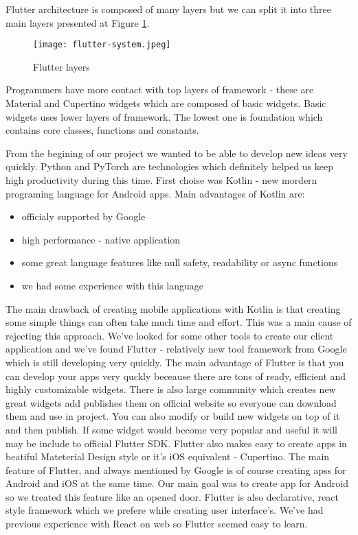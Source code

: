 \documentclass[../Main.tex]{subfiles}
\begin{document}
        
        Flutter architecture is composed of many layers but we can split it into 
        three main layers presented at Figure \ref{fig:flutter-layers}.
        \begin{figure}[h]
            \centering
            \texttt{[image: flutter-system.jpeg]}
            \caption{Flutter layers}
            \label{fig:flutter-layers}
        \end{figure}
        Programmers have more contact with top layers of framework - 
        these are Material and Cupertino widgets which are composed of basic widgets.
        Basic widgets uses lower layers of framework. 
        The lowest one is foundation which contains core classes, functions and constants.
    
    
        From the begining of our project we wanted to be able to develop new ideas
        very quickly.
        Python and PyTorch are technologies which definitely helped us keep high
        productivity during this time. First choise was Kotlin - new mordern programing 
        language for Android apps. Main advantages of Kotlin are:
            \begin{itemize}
                \item officialy supported by Google
                \item high performance - native application
                \item some great language features like null safety, readability or async functions
                \item we had some experience with this language
            \end{itemize}
            
        The main drawback of creating mobile applications with Kotlin is that creating
        some simple things can often take much time and effort. 
        This was a main cause of rejecting this approach.
        We've looked for some other tools to create our client application and 
        we've found Flutter - relatively new tool framework from Google which 
        is still developing very quickly.
        The main advantage of Flutter is that you can develop your apps very 
        quckly beceause there are tons of ready, efficient and highly customizable 
        widgets. There is also large community which creates new great widgets 
        add publishes them on official website so everyone can download them and use in project.
        You can also modify or build new widgets on top of it and then publish.
        If some widget would become very popular and useful it will may be 
        include to official Flutter SDK. 
        Flutter also makes easy to create apps in beatiful Mateterial Design 
        style or it's iOS equivalent - Cupertino. 
        The main feature of Flutter, and always mentioned by Google is of course 
        creating apss for Android and iOS at the same time. 
        Our main goal was to create app for Android so we treated this feature like 
        an opened door. 
        Flutter is also declarative, react style framework which we prefere while
        creating user interface's. We've had previous experience with React on web
        so Flutter seemed easy to learn. 
        
\end{document}
